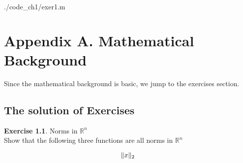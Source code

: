 \documentclass[11pt,a4paper]{report}
\theoremstyle{definition}\newtheorem{exercise}{Exercise}[chapter]
\begin{document}

{./code_ch1/exer1.m}


















\chapter{Appendix A. Mathematical Background}
Since the mathematical background is basic, we jump to the exercises section.
\section{The solution of Exercises}
\begin{exercise} Norms in $\mathbb{R}^n$\\
Show that the following three functions are all norms in $\mathbb{R}^n$

\begin{equation}\notag
    \|x\|_2 
\end{equation}

\end{exercise}
\end{document}
